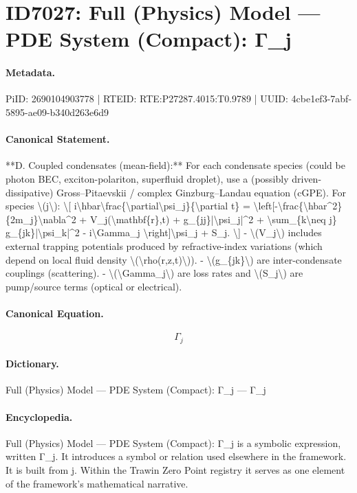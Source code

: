 \section*{ID7027: Full (Physics) Model — PDE System (Compact): Γ\_j}
\paragraph{Metadata.}
PiID: 2690104903778 | RTEID: RTE:P27287.4015:T0.9789 | UUID: 4cbe1ef3-7abf-5895-ae09-b340d263e6d9

\paragraph{Canonical Statement.}
**D. Coupled condensates (mean-field):** For each condensate species (could be photon BEC, exciton-polariton, superfluid droplet), use a (possibly driven-dissipative) Gross–Pitaevskii / complex Ginzburg–Landau equation (cGPE). For species \textbackslash{}(j\textbackslash{}): \textbackslash{}[ i\textbackslash{}hbar\textbackslash{}frac\{\textbackslash{}partial\textbackslash{}psi\_j\}\{\textbackslash{}partial t\} = \textbackslash{}left[-\textbackslash{}frac\{\textbackslash{}hbar\textasciicircum{}2\}\{2m\_j\}\textbackslash{}nabla\textasciicircum{}2 + V\_j(\textbackslash{}mathbf\{r\},t) + g\_\{jj\}|\textbackslash{}psi\_j|\textasciicircum{}2 + \textbackslash{}sum\_\{k\textbackslash{}neq j\} g\_\{jk\}|\textbackslash{}psi\_k|\textasciicircum{}2 - i\textbackslash{}Gamma\_j \textbackslash{}right]\textbackslash{}psi\_j + S\_j. \textbackslash{}] - \textbackslash{}(V\_j\textbackslash{}) includes external trapping potentials produced by refractive-index variations (which depend on local fluid density \textbackslash{}(\textbackslash{}rho(r,z,t)\textbackslash{})). - \textbackslash{}(g\_\{jk\}\textbackslash{}) are inter-condensate couplings (scattering). - \textbackslash{}(\textbackslash{}Gamma\_j\textbackslash{}) are loss rates and \textbackslash{}(S\_j\textbackslash{}) are pump/source terms (optical or electrical).

\paragraph{Canonical Equation.}
\[
\Gamma_j
\]

\paragraph{Dictionary.}
Full (Physics) Model — PDE System (Compact): Γ\_j — Γ\_j

\paragraph{Encyclopedia.}
Full (Physics) Model — PDE System (Compact): Γ\_j is a symbolic expression, written Γ\_j. It introduces a symbol or relation used elsewhere in the framework. It is built from j. Within the Trawin Zero Point registry it serves as one element of the framework's mathematical narrative.

